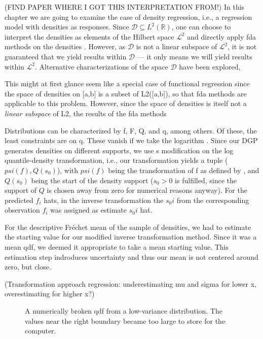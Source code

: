 (FIND PAPER WHERE I GOT THIS INTERPRETATION FROM!)
In this chapter we are going to examine the case of density regression, i.e., a
regression model with densities as responses. Since $\mathcal{D} \subseteq L^2(\mathbb{R})$,
one can choose to interpret the densities as elements of
the Hilbert space $\mathcal{L}^2$ and directly apply fda methods on the densities
\parencite[see e.g.][]{KneipUtikal2001}. However,
as $\mathcal{D}$ is not a linear subspace of $\mathcal{L}^2$, it is not guaranteed that
we yield results within $\mathcal{D}$ --- it only means we will yield results within $\mathcal{L}^2$.
Alternative characterizations of the space $\mathcal{D}$ have been explored,

This might at first glance seem like a
special case of functional regression since the space of densities on [a,b] is a subset
of L2([a,b]), so that fda methods are applicable to this problem. However, since the
space of densities is itself not a \textit{linear subspace} of L2, the results of the
fda methods

Distributions can be characterized by f, F, Q, and q, among others. Of these, the least
constraints are on q. These vanish if we
take the logarithm \parencite[cf.][]{KokoszkaEtAl2019}. Since our DGP generates densities on
different supports, we use \textcite{KokoszkaEtAl2019}s modification on the log quantile-density
transformation, i.e., our transformation yields a tuple ($psi(f), Q(s_0)$), with
$psi(f)$ being the transformation of f as defined by \textcite{PetersenMüller2016}, and
$Q(s_0)$ being the start of the density support ($s_0 > 0$ is fulfilled, since the support
of $Q$ is chosen away from zero for numerical reasons anyway). For the predicted $f_i$ hats,
in the inverse transformation the $s_0i$ from the corresponding observation $f_i$ was
assigned as estimate $s_0i$ hat.

For the descriptive Fréchet mean of the sample of densities, we had to estimate the
starting value for our modified inverse transformation method. Since it was a mean qdf,
we deemed it appropriate to take a mean starting value. This estimation step indroduces
uncertainty and thus our mean is not centered around zero, but close.

(Transformation approach regression: underestimating mu and sigma for lower x,
overestimating for higher x?) \textcite{PetersenLiuDivani2021}

\begin{figure}[h]
    \centering
    
    \caption{A numerically broken qdf from a low-variance distribution. The values
    near the right boundary became too large to store for the computer.}
    \label{fig:broken_qdf}
\end{figure}

